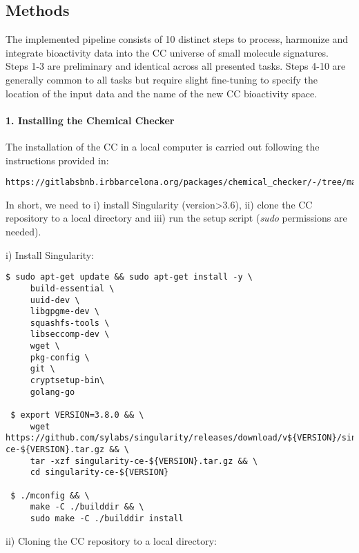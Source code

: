 \subsection{Methods}
\label{Protocols_Methods}

The implemented pipeline consists of 10 distinct steps to process, harmonize and integrate bioactivity data into the CC universe of small molecule signatures. Steps 1-3 are preliminary and identical across all presented tasks. Steps 4-10 are generally common to all tasks but require slight fine-tuning to specify the location of the input data and the name of the new CC bioactivity space.

\paragraph{1. Installing the Chemical Checker} \leavevmode

The installation of the CC in a local computer is carried out following the instructions provided in: \\

\begin{lstlisting}
https://gitlabsbnb.irbbarcelona.org/packages/chemical_checker/-/tree/master
\end{lstlisting}

In short, we need to i) install Singularity (version>3.6), ii) clone the CC repository to a local directory and iii) run the setup script (\textit{sudo} permissions are needed).

i) Install Singularity: \\

\begin{lstlisting}
$ sudo apt-get update && sudo apt-get install -y \
     build-essential \
     uuid-dev \
     libgpgme-dev \
     squashfs-tools \
     libseccomp-dev \
     wget \
     pkg-config \
     git \
     cryptsetup-bin\
     golang-go

 $ export VERSION=3.8.0 && \
     wget https://github.com/sylabs/singularity/releases/download/v${VERSION}/singularity-ce-${VERSION}.tar.gz && \
     tar -xzf singularity-ce-${VERSION}.tar.gz && \
     cd singularity-ce-${VERSION}

 $ ./mconfig && \
     make -C ./builddir && \
     sudo make -C ./builddir install
\end{lstlisting}

ii) Cloning the CC repository to a local directory: \\

